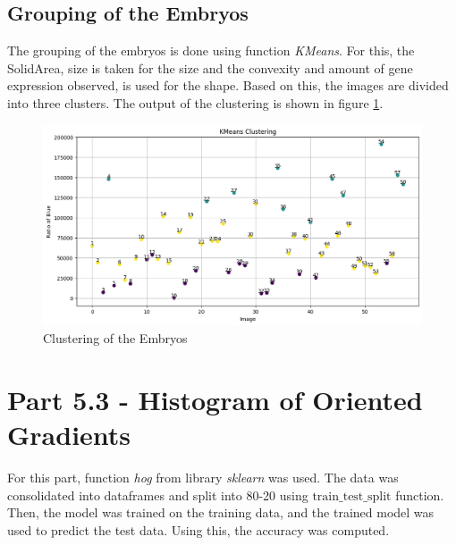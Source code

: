 \documentclass{article}
\begin{document}
\subsection*{Grouping of the Embryos}
The grouping of the embryos is done using function \textit{KMeans}. For this, the SolidArea, size is taken for the size and the convexity and amount of gene expression observed, is used for the shape. 
Based on this, the images are divided into three clusters. The output of the clustering is shown in figure \ref{fig:KMeans_Clustering}.
\begin{figure}
    \centering
    \includegraphics[width=1\linewidth]{Report/Images/ClusteringGroup.png}
    \caption{Clustering of the Embryos}
    \label{fig:KMeans_Clustering}
\end{figure}
\clearpage

\section*{Part 5.3 - Histogram of Oriented Gradients}
For this part, function \textit{hog} from library \textit{sklearn} was used. The data was consolidated into dataframes and split into 80-20 using $\text{train\_test\_split}$ function. \\Then, the model was trained on the training data, and the trained model was used to predict the test data. Using this, the accuracy was computed. 
\end{document}
